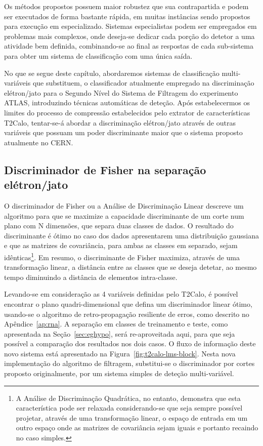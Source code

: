 Os métodos propostos possuem maior robustez que sua contrapartida e podem ser
executados de forma bastante rápida, em muitas instâncias sendo propostos para
execução em  especializado. Sistemas especialistas podem ser
empregados em problemas mais complexos, onde deseja-se dedicar cada porção do
detetor a uma atividade bem definida, combinando-se ao final as respostas de
cada sub-sistema para obter um sistema de classificação com uma única saída.

No que se segue deste capítulo, abordaremos sistemas de classificação
multi-variáveis que substituem, o classificador atualmente empregado na
discriminação elétron/jato para o Segundo Nível do Sistema de Filtragem do
experimento ATLAS, introduzindo técnicas automáticas de deteção. Após
estabelecermos os limites do processo de compressão estabelecidos pelo
extrator de características T2Calo, tentar-se-á abordar a discriminação
elétron/jato através de outras variáveis que possuam um poder discriminante
maior que o sistema proposto atualmente no CERN.

\subsection{Discriminador de Fisher na separação e\-lé\-tron/jato}
\label{sec:linear}

O discriminador de Fisher \cite{fisher} ou a Análise de Discriminação Linear
descreve um algoritmo para que se maximize a capacidade discriminante de um
corte num plano com N dimensões, que separa duas classes de dados. O resultado
do discriminante é ótimo no caso dos dados apresentarem uma distribuição
gaussiana e que as matrizes de covariância, para ambas as classes em separado,
sejam idênticas\footnote{A Análise de Discriminação Quadrática, no entanto,
demonstra que esta característica pode ser relaxada considerando-se que seja
sempre possível projetar, através de uma transformação linear, o espaço de
entrada em um outro espaço onde as matrizes de covariância sejam iguais e
portanto recaindo no caso simples.}. Em resumo, o discriminante de Fisher
maximiza, através de uma transformação linear, a distância entre as classes
que se deseja detetar, ao mesmo tempo diminuindo a distância de elementos
intra-classe.

Levando-se em consideração as 4 variáveis definidas pelo T2Calo, é possível
encontrar o plano quadri-dimensional que defina um discriminador linear ótimo,
usando-se o algoritmo de retro-propagação resiliente de erros, como descrito
no Apêndice~\ref{ap:rna}. A separação em classes de treinamento e teste, como
apresentada na Seção~\ref{sec:eghypo}, será re-aproveitada aqui, para que seja
possível a comparação dos resultados nos dois casos. O fluxo de informação
deste novo sistema está apresentado na
Figura~\ref{fig:t2calo-lms-block}. Nesta nova implementação do algoritmo de 
filtragem, substitui-se o discriminador por cortes proposto originalmente, por
um sistema simples de deteção multi-variável.

